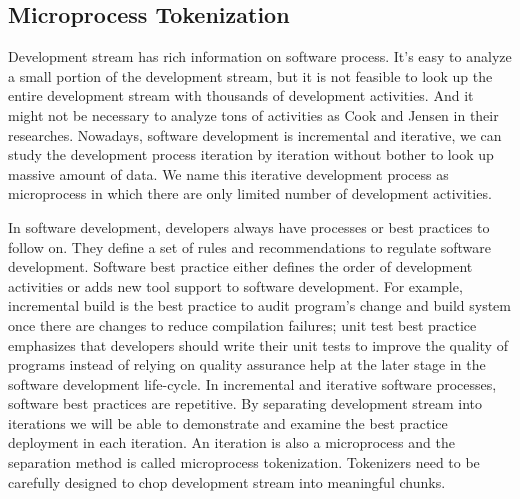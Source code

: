 \subsection{Microprocess Tokenization}
Development stream has rich information on software process. It's easy to
analyze a small portion of the development stream, but it is not feasible
to look up the entire development stream with thousands of development
activities. And it might not be necessary to analyze tons of activities as
Cook \cite{Cook:95} and Jensen \cite{Jensen:04} in their researches.
Nowadays, software development is incremental and iterative, we can study
the development process iteration by iteration without bother to look up
massive amount of data. We name this iterative development process as
microprocess in which there are only limited number of development
activities.

In software development, developers always have processes or best practices
to follow on.  They define a set of rules and recommendations to regulate
software development. Software best practice either defines the order of
development activities or adds new tool support to software development.
For example, incremental build is the best practice to audit program's
change and build system once there are changes to reduce compilation
failures; unit test best practice emphasizes that developers should write
their unit tests to improve the quality of programs instead of relying on
quality assurance help at the later stage in the software development
life-cycle. In incremental and iterative software processes, software best
practices are repetitive.  By separating development stream into iterations
we will be able to demonstrate and examine the best practice deployment in
each iteration. An iteration is also a microprocess and the separation 
method is called microprocess tokenization. Tokenizers need to be carefully
designed to chop development stream into meaningful chunks.

